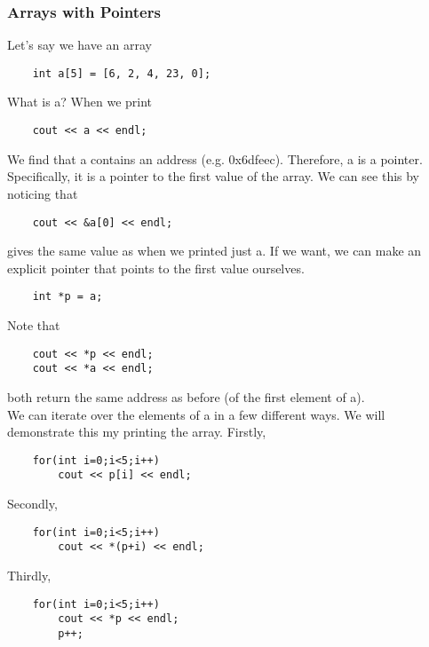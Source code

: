 \documentclass[]{article}
\begin{document}
\subsubsection{Arrays with Pointers}
\bigbreak

Let's say we have an array

\begin{lstlisting}
	int a[5] = [6, 2, 4, 23, 0];
\end{lstlisting}\bigbreak

What is a? When we print 

\begin{lstlisting}
	cout << a << endl;
\end{lstlisting}\bigbreak

We find that a contains an address (e.g. 0x6dfeec). Therefore, a is a pointer. Specifically, it is a pointer to the first value of the array. We can see this by noticing that 

\begin{lstlisting}
	cout << &a[0] << endl;
\end{lstlisting}\bigbreak

gives the same value as when we printed just a. If we want, we can make an explicit pointer that points to the first value ourselves.

\begin{lstlisting}
	int *p = a;
\end{lstlisting}\bigbreak

Note that

\begin{lstlisting}
	cout << *p << endl;
	cout << *a << endl;
\end{lstlisting}\bigbreak

both return the same address as before (of the first element of a).\\

We can iterate over the elements of a in a few different ways. We will demonstrate this my printing the array. Firstly,

\begin{lstlisting}
	for(int i=0;i<5;i++)
		cout << p[i] << endl;
\end{lstlisting}\bigbreak

Secondly,

\begin{lstlisting}
	for(int i=0;i<5;i++)
		cout << *(p+i) << endl;
\end{lstlisting}\bigbreak

Thirdly, 
\begin{lstlisting}
	for(int i=0;i<5;i++)
		cout << *p << endl;
		p++;
\end{lstlisting}\bigbreak
\end{document}
